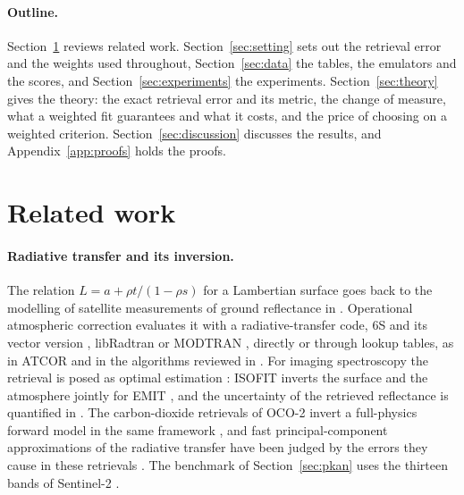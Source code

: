 \documentclass[11pt]{article}
\theoremstyle{remark}
\newcommand{\1}{\mathbf{1}}
\begin{document}
\paragraph{Outline.} Section~\ref{sec:related} reviews related work. Section~\ref{sec:setting} sets out the retrieval
error and the weights used throughout, Section~\ref{sec:data} the tables, the emulators and the scores, and
Section~\ref{sec:experiments} the experiments. Section~\ref{sec:theory} gives the theory: the exact retrieval error and
its metric, the change of measure, what a weighted fit guarantees and what it costs, and the price of choosing on a
weighted criterion. Section~\ref{sec:discussion} discusses the results, and Appendix~\ref{app:proofs} holds the proofs.

\section{Related work}\label{sec:related}

\paragraph{Radiative transfer and its inversion.} The relation $L=a+\rho t/(1-\rho s)$ for a Lambertian surface goes
back to the modelling of satellite measurements of ground reflectance in \cite{tanre1979}. Operational atmospheric
correction evaluates it with a radiative-transfer code, 6S and its vector version \cite{vermote,kotchenova2006},
libRadtran \cite{mayer,emde} or MODTRAN \cite{modtran}, directly or through lookup tables, as in ATCOR
\cite{richter2002} and in the algorithms reviewed in \cite{gao2009}. For imaging spectroscopy the retrieval is posed as
optimal estimation \cite{rodgers}: ISOFIT inverts the surface and the atmosphere jointly for EMIT \cite{isofit}, and the
uncertainty of the retrieved reflectance is quantified in \cite{thompson2020}. The carbon-dioxide retrievals of OCO-2
invert a full-physics forward model in the same framework \cite{connor,odell,crisp,eldering}, and fast
principal-component approximations of the radiative transfer \cite{kopparla2016} have been judged by the errors they
cause in these retrievals \cite{somkuti2017,somkuti2020}. The benchmark of Section~\ref{sec:pkan} uses the thirteen bands of
Sentinel-2 \cite{drusch2012}.
\end{document}
